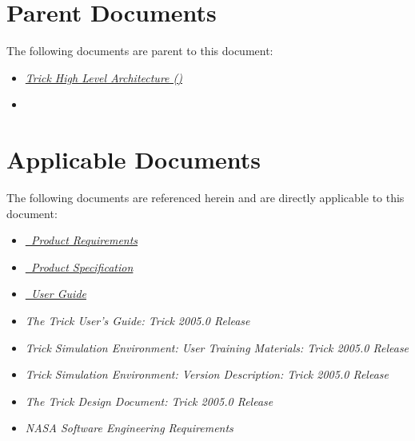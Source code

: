 \documentclass[twoside,11pt,titlepage]{report}
\begin{document}
\section{Parent Documents}
The following documents are parent to this document:

\begin{itemize}
\item{\href{file:\TRICKHLAHOME/docs/TrickHLA.pdf}
           {\em Trick High Level Architecture (\TrickHLA)}}
\cite{trickhlaenv:TrickHLA}

\item{\href{file:MODEL.pdf}
           {\em \MODEL}}
\cite{trickhlaenv:MODEL}
\end{itemize}

\section{Applicable Documents}
The following documents are referenced herein and are directly
applicable to this document:

\begin{itemize}
\item{\href{file:MODELReqt.pdf}
           {\em \MODEL\ Product Requirements}}
\cite{trickhlaenv:MODELReqt}

\item{\href{file:MODELSpec.pdf}
           {\em \MODEL\ Product Specification}}
\cite{trickhlaenv:MODELSpec}

\item{\href{file:MODELUser.pdf}
           {\em \MODEL\ User Guide}}
\cite{trickhlaenv:MODELUser}

\item{\em The Trick User's Guide: Trick 2005.0 Release}
\cite{Vetter:TrickUser}

\item{\em Trick Simulation Environment: User Training Materials:
          Trick 2005.0 Release}
\cite{Vetter:TrickUTM}

\item{\em Trick Simulation Environment: Version Description:
          Trick 2005.0 Release}
\cite{Vetter:TrickVD}

\item{\em The Trick Design Document: Trick 2005.0 Release}
\cite{Vetter:TrickDD}

\item{\em NASA Software Engineering Requirements}
\cite{NASA:SWE}

\end{itemize}
\end{document}

